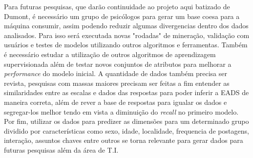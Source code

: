 Para futuras pesquisas, que darão continuidade ao projeto aqui batizado de Dumont, é necessário um grupo de psicólogos para gerar um base coesa para a máquina consumir, assim podendo reduzir algumas divergencias dentro dos dados analisados. Para isso será executada novas "rodadas" de mineração, validação com usuários e testes de modelos utilizando outros algoritmos e ferramentas. Também é necessário estudar a utilização de outros algoritmos de aprendizagem supervisionada além de testar novos conjuntos de atributos para melhorar a \textit{performance} do modelo inicial. A quantidade de dados também precisa ser revista, pesquisas com massas maiores precisam ser feitas a fim entender as similaridades entre as escalas e dados das respostas para poder inferir a EADS de maneira correta, além de rever a base de respostas para igualar os dados e segregar-los melhor tendo em vista a diminuição do \textit{recall} no primeiro modelo. Por fim, utilizar os dados para predizer as dimensões para um determinado grupo dividido por características como sexo, idade, localidade, frequencia de postagens, interação, assuntos chaves entre outros se torna relevante para gerar dados para futuras pesquisas além da área de T.I.